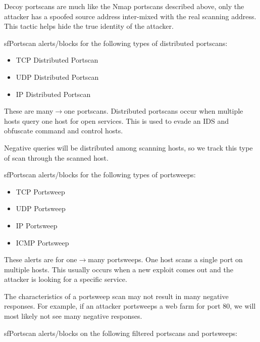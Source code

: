 \documentclass[english]{report}
\newenvironment{note}{
\samepage
    \vspace{10pt}{\textsf{
        {\hspace{7pt}\Huge{$\triangle$\hspace{-12.5pt}{\Large{$^!$}}}}\hspace{5pt}
        {\Large{NOTE}}
    }
    }
   \begin{center}
    \par\vspace{-17pt}

    \begin{lrbox}{\savepar}
    \begin{minipage}[r]{6in}
}
{
    \end{minipage}
    \end{lrbox}
    \fbox{
        \usebox{
            \savepar
	}
    }
    \par\vskip10pt
    \end{center}
}
\newenvironment{note}{
        \begin{rawhtml}
        <p><table border="1"><tr><td><b>
        Note:&nbsp;&nbsp;</b>
        \end{rawhtml}
}{
        \begin{rawhtml}
        </b></td></tr></table></p>
        \end{rawhtml}
}
\begin{document}
Decoy portscans are much like the Nmap portscans described above, only the
attacker has a spoofed source address inter-mixed with the real scanning
address. This tactic helps hide the true identity of the attacker.

sfPortscan alerts/blocks for the following types of distributed portscans:

\begin{itemize}
\item TCP Distributed Portscan
\item UDP Distributed Portscan
\item IP Distributed Portscan
\end{itemize}

These are many$\rightarrow$one portscans. Distributed portscans occur when
multiple hosts query one host for open services. This is used to evade an IDS
and obfuscate command and control hosts.

\begin{note}

Negative queries will be distributed among scanning hosts, so we track this
type of scan through the scanned host.

\end{note}

sfPortscan alerts/blocks for the following types of portsweeps:

\begin{itemize}
\item TCP Portsweep
\item UDP Portsweep
\item IP Portsweep
\item ICMP Portsweep
\end{itemize}

These alerts are for one$\rightarrow$many portsweeps. One host scans a single
port on multiple hosts. This usually occurs when a new exploit comes out and
the attacker is looking for a specific service. 

\begin{note}

The characteristics of a portsweep scan may not result in many negative
responses. For example, if an attacker portsweeps a web farm for port 80, we
will most likely not see many negative responses.

\end{note}

sfPortscan alerts/blocks on the following filtered portscans and portsweeps:
\end{document}
